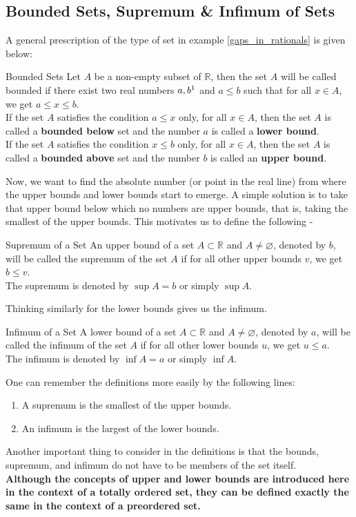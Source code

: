 \subsection{Bounded Sets, Supremum \& Infimum of Sets}
A general prescription of the type of set in example \eqref{gaps_in_rationals} is given below:
\begin{Definition}{Bounded Sets}\label{bounded_sets}
    Let $A$ be a non-empty subset of $\mathbb{R}$, then the set $A$ will be called bounded if there exist two real numbers $a, b\footnotemark$ and $a\leq b$ such that for all $x\in A$, we get $a\leq x\leq b$.\\
    If the set $A$ satisfies the condition $a\leq x$ only, for all $x\in A$, then the set $A$ is called a \textbf{bounded below} set and the number $a$ is called a \textbf{lower bound}.\\
    If the set $A$ satisfies the condition $x\leq b$ only, for all $x\in A$, then the set $A$ is called a \textbf{bounded above} set and the number $b$ is called an \textbf{upper bound}.
\end{Definition}
\noindent Now, we want to find the absolute number (or point in the real line) from where the upper bounds and lower bounds start to emerge. A simple solution is to take that upper bound below which no numbers are upper bounds, that is, taking the smallest of the upper bounds. This motivates us to define the following -
\begin{Definition}{Supremum of a Set}\label{supremum}
    An upper bound of a set $A\subset\mathbb{R}$ and $A\neq\varnothing$, denoted by $b$, will be called the supremum of the set $A$ if for all other upper bounds $v$, we get $b\leq v$.\\
    The supremum is denoted by $\sup A=b$ or simply $\sup A$.
\end{Definition}
\noindent Thinking similarly for the lower bounds gives us the infimum.
\begin{Definition}{Infimum of a Set}\label{infimum}
    A lower bound of a set $A\subset\mathbb{R}$ and $A\neq\varnothing$, denoted by $a$, will be called the infimum of the set $A$ if for all other lower bounds $u$, we get $u\leq a$.\\
    The infimum is denoted by $\inf A=a$ or simply $\inf A$.
\end{Definition}
\noindent One can remember the definitions more easily by the following lines:
\begin{enumerate}
    \item A supremum is the smallest of the upper bounds.
    \item An infimum is the largest of the lower bounds.
\end{enumerate}
Another important thing to consider in the definitions is that the bounds, supremum, and infimum do not have to be members of the set itself.\\
\textbf{Although the concepts of upper and lower bounds are introduced here in the context of a totally ordered set, they can be defined exactly the same in the context of a preordered set.}

